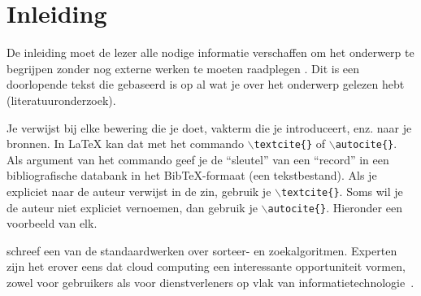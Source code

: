 
\chapter{Inleiding}
\label{ch:inleiding}

De inleiding moet de lezer alle nodige informatie verschaffen om het onderwerp te begrijpen zonder nog externe werken te moeten raadplegen \autocite{Pollefliet2011}. Dit is een doorlopende tekst die gebaseerd is op al wat je over het onderwerp gelezen hebt (literatuuronderzoek).

Je verwijst bij elke bewering die je doet, vakterm die je introduceert, enz. naar je bronnen. In \LaTeX{} kan dat met het commando \texttt{$\backslash${textcite\{\}}} of \texttt{$\backslash${autocite\{\}}}. Als argument van het commando geef je de ``sleutel'' van een ``record'' in een bibliografische databank in het Bib\TeX{}-formaat (een tekstbestand). Als je expliciet naar de auteur verwijst in de zin, gebruik je \texttt{$\backslash${}textcite\{\}}.
Soms wil je de auteur niet expliciet vernoemen, dan gebruik je \texttt{$\backslash${}autocite\{\}}. Hieronder een voorbeeld van elk.

\textcite{Knuth1998} schreef een van de standaardwerken over sorteer- en zoekalgoritmen. Experten zijn het erover eens dat cloud computing een interessante opportuniteit vormen, zowel voor gebruikers als voor dienstverleners op vlak van informatietechnologie~\autocite{Creeger2009}.

